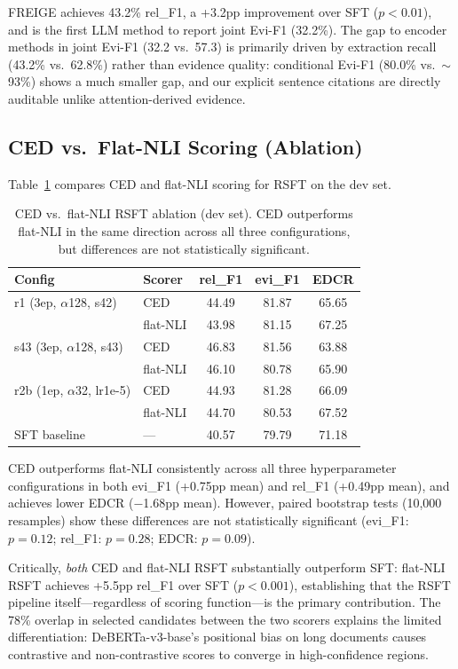 \documentclass[11pt]{article}
\newcommand{\method}{FREIGE}
\newcommand{\rsft}{RSFT}
\begin{document}
\method{} achieves 43.2\% rel\_F1, a +3.2pp improvement over SFT ($p{<}0.01$), and is the first LLM method to report joint Evi-F1 (32.2\%).
The gap to encoder methods in joint Evi-F1 (32.2 vs.\ 57.3) is primarily driven by extraction recall (43.2\% vs.\ 62.8\%) rather than evidence quality: conditional Evi-F1 (80.0\% vs.\ ${\sim}$93\%) shows a much smaller gap, and our explicit sentence citations are directly auditable unlike attention-derived evidence.

\subsection{CED vs.\ Flat-NLI Scoring (Ablation)}

Table~\ref{tab:ced_ablation} compares CED and flat-NLI scoring for RSFT on the dev set.

\begin{table}[t]
\centering
\small
\begin{tabular}{llccc}
\toprule
\textbf{Config} & \textbf{Scorer} & \textbf{rel\_F1} & \textbf{evi\_F1} & \textbf{EDCR} \\
\midrule
r1 (3ep, $\alpha$128, s42) & CED & 44.49 & 81.87 & 65.65 \\
 & flat-NLI & 43.98 & 81.15 & 67.25 \\
\midrule
s43 (3ep, $\alpha$128, s43) & CED & 46.83 & 81.56 & 63.88 \\
 & flat-NLI & 46.10 & 80.78 & 65.90 \\
\midrule
r2b (1ep, $\alpha$32, lr1e-5) & CED & 44.93 & 81.28 & 66.09 \\
 & flat-NLI & 44.70 & 80.53 & 67.52 \\
\midrule
SFT baseline & --- & 40.57 & 79.79 & 71.18 \\
\bottomrule
\end{tabular}
\caption{CED vs.\ flat-NLI RSFT ablation (dev set). CED outperforms flat-NLI in the same direction across all three configurations, but differences are not statistically significant.}
\label{tab:ced_ablation}
\end{table}

CED outperforms flat-NLI consistently across all three hyperparameter configurations in both evi\_F1 (+0.75pp mean) and rel\_F1 (+0.49pp mean), and achieves lower EDCR ($-$1.68pp mean).
However, paired bootstrap tests (10{,}000 resamples) show these differences are not statistically significant (evi\_F1: $p{=}0.12$; rel\_F1: $p{=}0.28$; EDCR: $p{=}0.09$).

Critically, \emph{both} CED and flat-NLI RSFT substantially outperform SFT: flat-NLI RSFT achieves +5.5pp rel\_F1 over SFT ($p{<}0.001$), establishing that the \rsft{} pipeline itself---regardless of scoring function---is the primary contribution.
The 78\% overlap in selected candidates between the two scorers explains the limited differentiation: DeBERTa-v3-base's positional bias on long documents causes contrastive and non-contrastive scores to converge in high-confidence regions.
\end{document}
